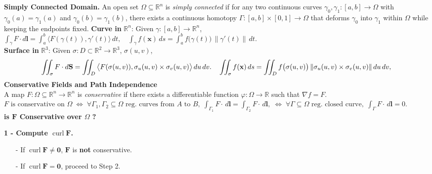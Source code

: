 \documentclass[8pt]{article}
\begin{document}
\smallskip
\noindent\textbf{Simply Connected Domain.}
An open set $\Omega \subseteq \mathbb{R}^n$ is \emph{simply connected} if for any two continuous curves
$\gamma_0, \gamma_1 : [a,b] \to \Omega$
with $\gamma_0(a) = \gamma_1(a)$ and $\gamma_0(b) = \gamma_1(b)$,
there exists a continuous homotopy
$\Gamma : [a,b]\times[0,1] \to \Omega$
that deforms $\gamma_0$ into $\gamma_1$ within $\Omega$ while keeping the endpoints fixed.
\smallskip \newline
\noindent\textbf{Curve in } $\mathbb{R}^n$: Given $\gamma : [a,b] \to \mathbb{R}^n$,$ \int_{\gamma} F \cdot d\mathbf{l} = \int_a^b \big\langle F(\gamma(t)), \gamma'(t)\big\rangle \, dt, \quad \int_{\gamma} f(\mathbf{x}) \, ds = \int_a^b f\big(\gamma(t)\big)\,\|\gamma'(t)\| \, dt.$\\
\noindent\textbf{Surface in } $\mathbb{R}^3$:
Given $\sigma : D \subset \mathbb{R}^2 \to \mathbb{R}^3$, $\sigma(u,v)$, \vspace{-10px}
\[
\iint_{\sigma} F \cdot d\mathbf{S}
= \iint_D \big\langle F(\sigma(u,v)), \sigma_u(u,v)\times\sigma_v(u,v)\big\rangle \,du\,dv.
\quad
\iint_{\sigma} f(\mathbf{x}) \, ds
= \iint_D f\big(\sigma(u,v)\big)\,\|\sigma_u(u,v)\times\sigma_v(u,v)\| \,du\,dv,\vspace{-10px}
\]
\noindent \textbf{Conservative Fields and Path Independence}\\
A map \( F : \Omega \subseteq \mathbb{R}^n \to \mathbb{R}^n \) is \emph{conservative} if there exists a differentiable function \( \varphi : \Omega \to \mathbb{R} \) such that \( \nabla f = F \).\\
\small
$
F \text{ is conservative on } \Omega \; \iff \;
\forall \Gamma_1, \Gamma_2 \subseteq \Omega \text{ reg. curves from } A \text{ to } B, \; \int_{\Gamma_1} F \cdot \, d\mathbf{l} = \int_{\Gamma_2} F \cdot \, d\mathbf{l}, \;
\iff \; \forall \Gamma \subseteq \Omega \text{ reg. closed curve}, \; \int_{\Gamma} F \cdot \, d\mathbf{l} = 0.
$\\
\normalsize
\noindent\textbf{is $\mathbf{F}$ Conservative over $\Omega$ ?}\newline
\begin{minipage}[t]{0.17\textwidth}
    \noindent\textbf{1 - Compute $\operatorname{curl} \mathbf{F}$.} \vspace{-8px}
    \begin{itemize}[leftmargin=*]
        \setlength\itemsep{-4px}
        \item[-] If $\operatorname{curl} \mathbf{F} \neq \mathbf{0}$, $\mathbf{F}$ is \textbf{not} conservative.
        \item[-] If $\operatorname{curl} \mathbf{F} = \mathbf{0}$, proceed to Step 2.
    \end{itemize}
    \vspace{-5px}

\end{minipage}
\end{document}
